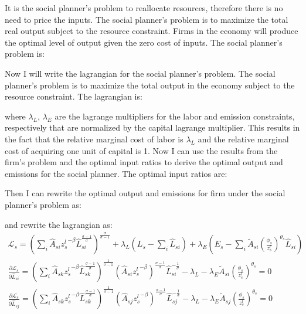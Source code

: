 It is the social planner's problem to reallocate resources, therefore there is no need to price the inputs. The social planner's problem is to maximize the total real output subject to the resource constraint. Firms in the economy will produce the optimal level of output given the zero cost of inputs. The social planner's problem is:


Now I will write the lagrangian for the social planner's problem. The social planner's problem is to maximize the total output in the economy subject to the resource constraint. The lagrangian is:

where $\lambda_L$, $\lambda_E$ are the lagrange multipliers for the labor and emission constraints, respectively that are normalized by the capital lagrange multiplier. This results in the fact that the relative marginal cost of labor is $\lambda_L$ and the relative marginal cost of acquiring one unit of capital is 1. Now I can use the results from the firm's problem and the optimal input ratios to derive the optimal output and emissions for the social planner. The optimal input ratios are:

Then I can rewrite the optimal output and emissions for firm under the social planner's problem as:

and rewrite the lagrangian as:
\begin{gather*}
    \mathcal{L}_s = \left(
        \sum_i \hat{A}_{si} {z_{s}^l}^{-\beta}\hat{L}_{si}^{\frac{\sigma-1}{\sigma}}
    \right)^{\frac{\sigma}{\sigma-1}} + \lambda_L(L_s - \sum_i \hat{L}_{si}) + \lambda_E(E_s - \sum_i \tilde{A}_{si}(\frac{\phi_{s}}{z^{l}_{s}})^{\theta_s} \hat{L}_{si})\\
    \frac{\partial \mathcal{L}_s}{\partial \hat{L}_{si}} = \left(
        \sum_i \hat{A}_{sk} {z_{s}^l}^{-\beta}\hat{L}_{sk}^{\frac{\sigma-1}{\sigma}}
    \right)^{\frac{1}{\sigma-1}}(\hat{A}_{si}{z_{s}^l}^{-\beta})^{\frac{\sigma-1}{\sigma}}\hat{L}_{si}^{-\frac{1}{\sigma}} - \lambda_L - \lambda_E \tilde{A}_{si}(\frac{\phi_{s}}{z^{l}_{s}})^{\theta_s} = 0\\
    \frac{\partial \mathcal{L}_s}{\partial \hat{L}_{sj}} = \left(
        \sum_i \hat{A}_{sk} {z_{s}^l}^{-\beta}\hat{L}_{sk}^{\frac{\sigma-1}{\sigma}}
    \right)^{\frac{1}{\sigma-1}}(\hat{A}_{sj}{z_{s}^l}^{-\beta})^{\frac{\sigma-1}{\sigma}}\hat{L}_{sj}^{-\frac{1}{\sigma}} - \lambda_L - \lambda_E \tilde{A}_{sj}(\frac{\phi_{s}}{z^{l}_{s}})^{\theta_s} = 0
\end{gather*}

